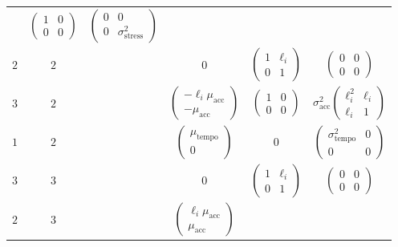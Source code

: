 \documentclass[aoas]{imsart}
\begin{document}
\begin{table}
\begin{tabular}[h!]{@{}cccccc@{}}
                                     & $\begin{pmatrix}1&0\\0&0\end{pmatrix}$
          & $\begin{pmatrix}0&0\\0&\sigma_{\textrm{stress}}^2\end{pmatrix}$\\
  $2$ & $2$ && 0 & $\begin{pmatrix} 1 & \ell_i \\ 0 & 1 \end{pmatrix}$ 
        & $\begin{pmatrix}0&0\\0&0\end{pmatrix}$\\
  $3$ & $2$ && $\begin{pmatrix} -\ell_i\mu_{\textrm{acc}}\\ -\mu_{\textrm{acc}}\end{pmatrix}$ 
                                    & $\begin{pmatrix} 1 & 0 \\ 0 &
                                      0 \end{pmatrix}$ 
        & $\sigma_{\textrm{acc}}^2\begin{pmatrix} \ell_i^2 & \ell_i\\ \ell_i & 1 \end{pmatrix}$\\
  $1$ & $2$ && $\begin{pmatrix} \mu_{\textrm{tempo}}\\0\end{pmatrix}$ & 0
        & $\begin{pmatrix} \sigma^2_{\textrm{tempo}} & 0\\ 0 & 0 \end{pmatrix}$\\
  $3$ & $3$ && 0& $\begin{pmatrix} 1 & \ell_i \\ 0 & 1 \end{pmatrix}$ 
        & $\begin{pmatrix}0&0\\0&0\end{pmatrix}$\\
$2$ & $3$ && $\begin{pmatrix} \ell_i\mu_{\textrm{acc}}\\ \mu_{\textrm{acc}}\end{pmatrix}$ 

\end{tabular}
\end{table}
\end{document}
